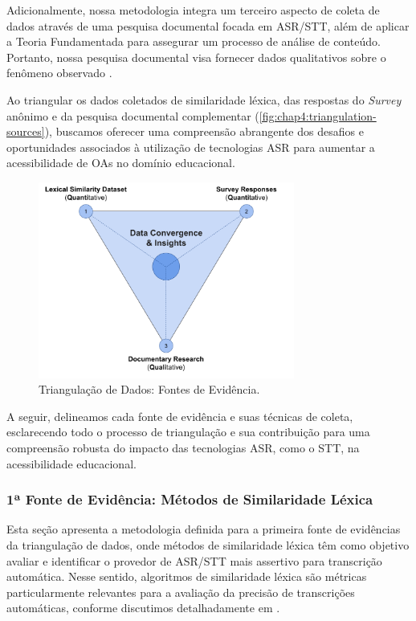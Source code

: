 Adicionalmente, nossa metodologia integra um terceiro aspecto de coleta de dados através de uma pesquisa documental focada em ASR/STT, além de aplicar a Teoria Fundamentada \cite{Charmaz2009} para assegurar um processo de análise de conteúdo. Portanto, nossa pesquisa documental visa fornecer dados qualitativos sobre o fenômeno observado \cite{LimaJunior2021}.

Ao triangular os dados coletados de similaridade léxica, das respostas do \textit{Survey} anônimo e da pesquisa documental complementar (\autoref{fig:chap4:triangulation-sources}), buscamos oferecer uma compreensão abrangente dos desafios e oportunidades associados à utilização de tecnologias ASR para aumentar a acessibilidade de OAs no domínio educacional. 

\begin{figure}[htb]
\centering
\includegraphics[width=0.75\textwidth]{images/chapter4-cs1-triangulation-sources.png}
\caption{Triangulação de Dados: Fontes de Evidência.}
\label{fig:chap4:triangulation-sources}
\end{figure}

A seguir, delineamos cada fonte de evidência e suas técnicas de coleta, esclarecendo todo o processo de triangulação e sua contribuição para uma compreensão robusta do impacto das tecnologias ASR, como o STT, na acessibilidade educacional.

\subsubsection{1ª Fonte de Evidência: Métodos de Similaridade Léxica}

Esta seção apresenta a metodologia definida para a primeira fonte de evidências da triangulação de dados, onde métodos de similaridade léxica têm como objetivo avaliar e identificar o provedor de ASR/STT mais assertivo para transcrição automática. Nesse sentido, algoritmos de similaridade léxica são métricas particularmente relevantes para a avaliação da precisão de transcrições automáticas, conforme discutimos detalhadamente em .

